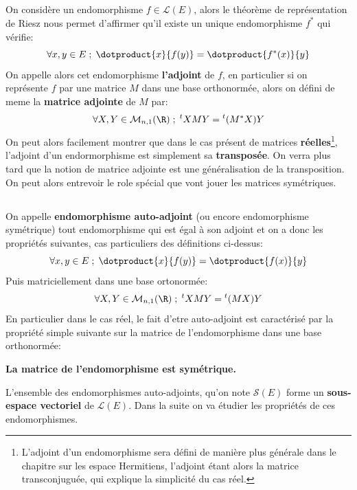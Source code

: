 \subsection*{}
On considère un endomorphisme \(f \in \mathcal{L}(E)\), alors le théorème de représentation de Riesz nous permet d'affirmer qu'il existe un unique endomorphisme \(f^*\) qui vérifie:
\[
   \forall x, y \in E \; ; \; \dotproduct{x}{f(y)} = \dotproduct{f^*(x)}{y}   
\]
On appelle alors cet endomorphisme \textbf{l'adjoint} de \(f\), en particulier si on représente \(f\) par une matrice \(M\) dans une base orthonormée, alors on défini de meme la \textbf{matrice adjointe} de \(M\) par:
\[
   \forall X, Y \in \mathcal{M}_{n, 1}(\R) \; ; \; {}^tXMY = {}^t(M^*X)Y  
\] 
On peut alors facilement montrer que dans le cas présent de matrices \textbf{réelles}\footnote[1]{L'adjoint d'un endomorphisme sera défini de manière plus générale dans le chapitre sur les espace Hermitiens, l'adjoint étant alors la matrice transconjuguée, qui explique la simplicité du cas réel.}, l'adjoint d'un endormorphisme est simplement sa \textbf{transposée}. On verra plus tard que la notion de matrice adjointe est une généralisation de la transposition. On peut alors entrevoir le role spécial que vont jouer les matrices symétriques.


\subsection*{}
On appelle \textbf{endomorphisme auto-adjoint} (ou encore endomorphisme symétrique) tout endomorphisme qui est égal à son adjoint et on a donc les propriétés suivantes, cas particuliers des définitions ci-dessus:
\[
   \forall x, y \in E \; ; \; \dotproduct{x}{f(y)} = \dotproduct{f(x)}{y}     
\]
Puis matriciellement dans une base ortonormée:
\[
   \forall X, Y \in \mathcal{M}_{n, 1}(\R) \; ; \; {}^tXMY = {}^t(MX)Y  
\]
En particulier dans le cas réel, le fait d'etre auto-adjoint est caractérisé par la propriété simple suivante sur la matrice de l'endomorphisme dans une base orthonormée:
\begin{center}
   \textbf{La matrice de l'endomorphisme est symétrique.}
\end{center}

L'ensemble des endomorphismes auto-adjoints, qu'on note \(\mathcal{S}(E)\) forme un \textbf{sous-espace vectoriel} de \(\mathcal{L}(E)\). Dans la suite on va étudier les propriétés de ces endomorphismes.


